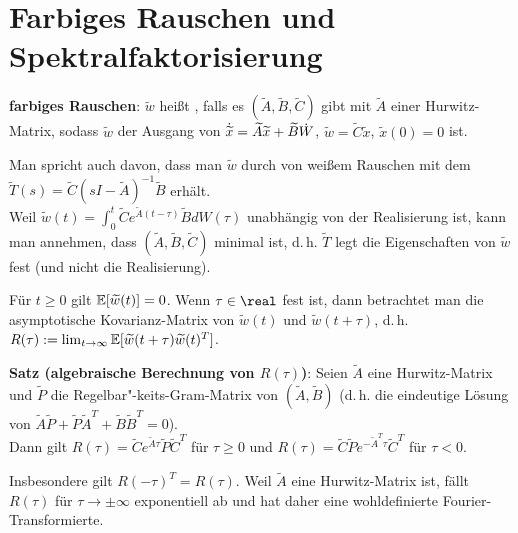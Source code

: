 \pagebreak

\section{%
    Farbiges Rauschen und Spektralfaktorisierung%
}

\textbf{farbiges Rauschen}:
$\widetilde{w}$ heißt , falls es
$(\widetilde{A}, \widetilde{B}, \widetilde{C})$ gibt
mit $\widetilde{A}$ einer Hurwitz-Matrix, sodass
$\widetilde{w}$ der Ausgang von
$\dotwidetilde{x} = \widetilde{A} \widetilde{x} + \widetilde{B} \dot{W}$,
$\widetilde{w} = \widetilde{C} \widetilde{x}$, $\widetilde{x}(0) = 0$ ist.

Man spricht auch davon, dass man $\widetilde{w}$ durch
 von weißem Rauschen mit dem 
$\widetilde{T}(s) = \widetilde{C} (sI - \widetilde{A})^{-1} \widetilde{B}$ erhält.\\
Weil $\widetilde{w}(t) = \int_0^t \widetilde{C} e^{\widetilde{A}(t - \tau)} \widetilde{B} dW(\tau)$
unabhängig von der Realisierung ist, kann man annehmen, dass
$(\widetilde{A}, \widetilde{B}, \widetilde{C})$ minimal ist,
d.\,h. $\widetilde{T}$ legt die Eigenschaften von $\widetilde{w}$ fest
(und nicht die Realisierung).

\linie

Für $t \ge 0$ gilt $\mathbb{E}[\widetilde{w}(t)] = 0$.
Wenn $\tau \in \real$ fest ist, dann betrachtet man die asymptotische Kovarianz-Matrix von
$\widetilde{w}(t)$ und $\widetilde{w}(t + \tau)$, d.\,h.
$R(\tau) := \lim_{t \to \infty} \mathbb{E}[\widetilde{w}(t + \tau) \widetilde{w}(t)^T]$.

\textbf{Satz (algebraische Berechnung von $R(\tau)$)}:
Seien $\widetilde{A}$ eine Hurwitz-Matrix und $\widetilde{P}$ die Regelbar"-keits-Gram-Matrix
von $(\widetilde{A}, \widetilde{B})$
(d.\,h. die eindeutige Lösung von
$\widetilde{A} \widetilde{P} +
\widetilde{P} \widetilde{A}^T + \widetilde{B} \widetilde{B}^T = 0$).\\
Dann gilt
$R(\tau) = \widetilde{C} e^{\widetilde{A}\tau} \widetilde{P} \widetilde{C}^T$ für $\tau \ge 0$ und
$R(\tau) = \widetilde{C} \widetilde{P} e^{-\widetilde{A}^T\tau} \widetilde{C}^T$ für $\tau < 0$.

Insbesondere gilt $R(-\tau)^T = R(\tau)$.
Weil $\widetilde{A}$ eine Hurwitz-Matrix ist, fällt $R(\tau)$ für $\tau \rightarrow \pm\infty$
exponentiell ab und hat daher eine wohldefinierte Fourier-Transformierte.

